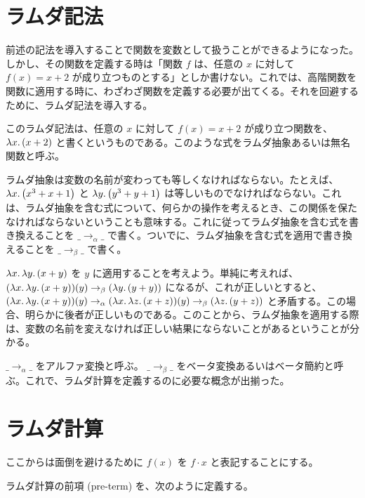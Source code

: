 \documentclass[book]{jlreq}
\newcommand{\p}[1]{ \mathord{ \left( #1 \right) } }
\begin{document}
\section{ラムダ記法}

前述の記法を導入することで関数を変数として扱うことができるようになった。しかし、その関数を定義する時は「関数 \( f \) は、任意の \( x \) に対して \( f \p{ x } = x + 2 \) が成り立つものとする」としか書けない。これでは、高階関数を関数に適用する時に、わざわざ関数を定義する必要が出てくる。それを回避するために、ラムダ記法を導入する。

このラムダ記法は、任意の \( x \) に対して \( f \p{ x } = x + 2 \) が成り立つ関数を、 \( \lambda x \ldotp \p{ x + 2 } \) と書くというものである。このような式をラムダ抽象あるいは無名関数と呼ぶ。

ラムダ抽象は変数の名前が変わっても等しくなければならない。たとえば、 \( \lambda x \ldotp \p{ x^3 + x + 1 } \) と \( \lambda y \ldotp \p{ y^3 + y + 1 } \) は等しいものでなければならない。これは、ラムダ抽象を含む式について、何らかの操作を考えるとき、この関係を保たなければならないということも意味する。これに従ってラムダ抽象を含む式を書き換えることを \( \_ \rightarrow_\alpha \_ \) で書く。ついでに、ラムダ抽象を含む式を適用で書き換えることを \( \_ \rightarrow_\beta \_ \) で書く。

\( \lambda x \ldotp \lambda y \ldotp \p{ x + y } \) を \( y \) に適用することを考えよう。単純に考えれば、 \( \p{ \lambda x \ldotp \lambda y \ldotp \p{ x + y } } \p{ y } \rightarrow_\beta \p{ \lambda y \ldotp \p{ y + y } } \) になるが、これが正しいとすると、 \( \p{ \lambda x \ldotp \lambda y \ldotp \p{ x + y } } \p{ y } \rightarrow_\alpha \p{ \lambda x \ldotp \lambda z \ldotp \p{ x + z } } \p{ y } \rightarrow_\beta \p{ \lambda z \ldotp \p{ y + z } } \) と矛盾する。この場合、明らかに後者が正しいものである。このことから、ラムダ抽象を適用する際は、変数の名前を変えなければ正しい結果にならないことがあるということが分かる。

\( \_ \rightarrow_\alpha \_ \) をアルファ変換と呼ぶ。 \( \_ \rightarrow_\beta \_ \) をベータ変換あるいはベータ簡約と呼ぶ。これで、ラムダ計算を定義するのに必要な概念が出揃った。

\section{ラムダ計算}

ここからは面倒を避けるために \( f \p{ x } \) を \( f \cdot x \) と表記することにする。

ラムダ計算の前項 (pre-term) を、次のように定義する。
\end{document}
